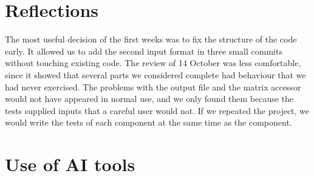 \documentclass[11pt,a4paper]{article}
\begin{document}
\section{Reflections}

The most useful decision of the first weeks was to fix the structure of the code early. It allowed us to add the second input format in three small commits without touching existing code. The review of 14 October was less comfortable, since it showed that several parts we considered complete had behaviour that we had never exercised. The problems with the output file and the matrix accessor would not have appeared in normal use, and we only found them because the tests supplied inputs that a careful user would not. If we repeated the project, we would write the tests of each component at the same time as the component.

\section{Use of AI tools}

\end{document}
